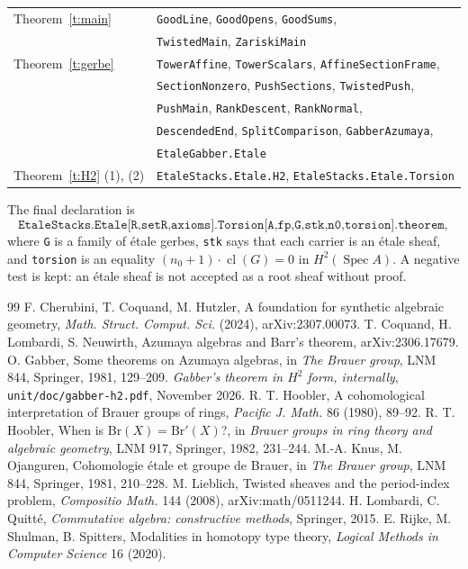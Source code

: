 \documentclass[11pt]{amsart}
\theoremstyle{definition}
\theoremstyle{remark}
\newcommand{\Spec}{\operatorname{Spec}}
\newcommand{\cl}{\operatorname{cl}}
\newcommand{\code}[1]{\texttt{#1}}
\begin{document}
\begin{center}
\begin{tabular}{@{}ll@{}}
Theorem~\ref{t:main} & \code{GoodLine}, \code{GoodOpens}, \code{GoodSums},\\
  & \code{TwistedMain}, \code{ZariskiMain}\\
Theorem~\ref{t:gerbe}
  & \code{TowerAffine}, \code{TowerScalars}, \code{AffineSectionFrame},\\
  & \code{SectionNonzero}, \code{PushSections}, \code{TwistedPush},\\
  & \code{PushMain}, \code{RankDescent}, \code{RankNormal},\\
  & \code{DescendedEnd}, \code{SplitComparison}, \code{GabberAzumaya},\\
  & \code{EtaleGabber.Etale}\\
Theorem~\ref{t:H2} (1), (2) & \code{EtaleStacks.Etale.H2}, \code{EtaleStacks.Etale.Torsion}
\end{tabular}
\end{center}

\smallskip
The final declaration is
\[\code{EtaleStacks.Etale[R,setR,axioms].Torsion[A,fp,G,stk,n0,torsion].theorem},\]
where \code{G} is a family of \'etale gerbes, \code{stk} says that each
carrier is an \'etale sheaf, and \code{torsion} is an equality
$(n_0+1)\cdot\cl(G)=0$ in $H^2(\Spec A)$. A negative test is kept: an
\'etale sheaf is not accepted as a root sheaf without proof.

\begin{thebibliography}{99}
 F. Cherubini, T. Coquand, M. Hutzler, A foundation for
  synthetic algebraic geometry, \emph{Math. Struct. Comput. Sci.} (2024),
  arXiv:2307.00073.
 T. Coquand, H. Lombardi, S. Neuwirth, Azumaya algebras and
  Barr's theorem, arXiv:2306.17679.
 O. Gabber, Some theorems on Azumaya algebras, in \emph{The
  Brauer group}, LNM 844, Springer, 1981, 129--209.
 \emph{Gabber's theorem in $H^2$ form, internally},
  \code{unit/doc/gabber-h2.pdf}, November 2026.
 R. T. Hoobler, A cohomological interpretation of Brauer
  groups of rings, \emph{Pacific J. Math.} 86 (1980), 89--92.
 R. T. Hoobler, When is $\mathrm{Br}(X)=\mathrm{Br}'(X)$?, in
  \emph{Brauer groups in ring theory and algebraic geometry}, LNM 917,
  Springer, 1982, 231--244.
 M.-A. Knus, M. Ojanguren, Cohomologie \'etale et groupe de
  Brauer, in \emph{The Brauer group}, LNM 844, Springer, 1981, 210--228.
 M. Lieblich, Twisted sheaves and the period-index problem,
  \emph{Compositio Math.} 144 (2008), arXiv:math/0511244.
 H. Lombardi, C. Quitt\'e, \emph{Commutative algebra:
  constructive methods}, Springer, 2015.
 E. Rijke, M. Shulman, B. Spitters, Modalities in homotopy type
  theory, \emph{Logical Methods in Computer Science} 16 (2020).
\end{thebibliography}
\end{document}
